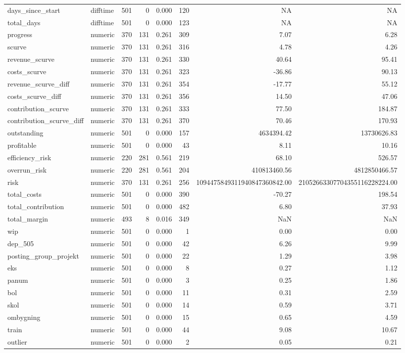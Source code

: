 \begin{landscape}
\begin{longtable}[t]{llrrrrrr}
days\_since\_start & difftime & 501 & 0 & 0.000 & 120 & NA & NA\\
total\_days & difftime & 501 & 0 & 0.000 & 123 & NA & NA\\
progress & numeric & 370 & 131 & 0.261 & 309 & 7.07 & 6.28\\
scurve & numeric & 370 & 131 & 0.261 & 316 & 4.78 & 4.26\\
revenue\_scurve & numeric & 370 & 131 & 0.261 & 330 & 40.64 & 95.41\\
costs\_scurve & numeric & 370 & 131 & 0.261 & 323 & -36.86 & 90.13\\
revenue\_scurve\_diff & numeric & 370 & 131 & 0.261 & 354 & -17.77 & 55.12\\
costs\_scurve\_diff & numeric & 370 & 131 & 0.261 & 356 & 14.50 & 47.06\\
contribution\_scurve & numeric & 370 & 131 & 0.261 & 333 & 77.50 & 184.87\\
contribution\_scurve\_diff & numeric & 370 & 131 & 0.261 & 370 & 70.46 & 170.93\\
outstanding & numeric & 501 & 0 & 0.000 & 157 & 4634394.42 & 13730626.83\\
profitable & numeric & 501 & 0 & 0.000 & 43 & 8.11 & 10.16\\
efficiency\_risk & numeric & 220 & 281 & 0.561 & 219 & 68.10 & 526.57\\
overrun\_risk & numeric & 220 & 281 & 0.561 & 204 & 410813460.56 & 4812850466.57\\
risk & numeric & 370 & 131 & 0.261 & 256 & 1094475849311940847360842.00 & 21052663307704355116228224.00\\
total\_costs & numeric & 501 & 0 & 0.000 & 390 & -70.27 & 198.54\\
total\_contribution & numeric & 501 & 0 & 0.000 & 482 & 6.80 & 37.93\\
total\_margin & numeric & 493 & 8 & 0.016 & 349 & NaN & NaN\\
wip & numeric & 501 & 0 & 0.000 & 1 & 0.00 & 0.00\\
dep\_505 & numeric & 501 & 0 & 0.000 & 42 & 6.26 & 9.99\\
posting\_group\_projekt & numeric & 501 & 0 & 0.000 & 22 & 1.29 & 3.98\\
eks & numeric & 501 & 0 & 0.000 & 8 & 0.27 & 1.12\\
panum & numeric & 501 & 0 & 0.000 & 3 & 0.25 & 1.86\\
bol & numeric & 501 & 0 & 0.000 & 11 & 0.31 & 2.59\\
skol & numeric & 501 & 0 & 0.000 & 14 & 0.59 & 3.71\\
ombygning & numeric & 501 & 0 & 0.000 & 15 & 0.65 & 4.59\\
train & numeric & 501 & 0 & 0.000 & 44 & 9.08 & 10.67\\
outlier & numeric & 501 & 0 & 0.000 & 2 & 0.05 & 0.21\\*
\end{longtable}
\end{landscape}
\endgroup{}

